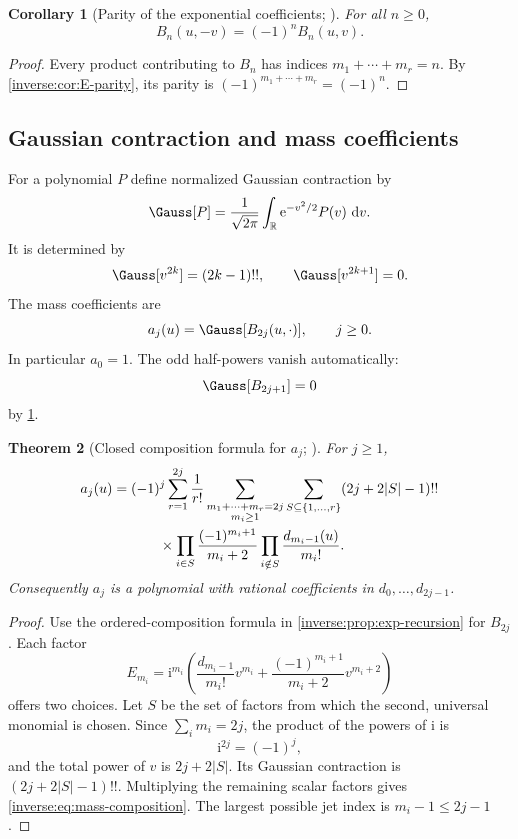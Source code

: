 \documentclass[11pt,oneside]{article}
\newtheorem{theorem}{Theorem}[section]
\newtheorem{corollary}[theorem]{Corollary}
\theoremstyle{definition}
\theoremstyle{remark}
\newcommand{\R}{\mathbb R}
\newcommand{\e}{\mathrm e}
\newcommand{\ii}{\mathrm i}
\newcommand{\dd}{\,\mathrm d}
\begin{document}
\begin{corollary}[Parity of the exponential coefficients; \Formalized]
\label{inverse:cor:B-parity}
For all $n\geq0$,
\[
 B_n(u,-v)=(-1)^nB_n(u,v).
\]
\end{corollary}

\begin{proof}
Every product contributing to $B_n$ has indices
$m_1+\cdots+m_r=n$.  By \cref{inverse:cor:E-parity}, its parity is
$(-1)^{m_1+\cdots+m_r}=(-1)^n$.
\end{proof}

\subsection{Gaussian contraction and mass coefficients}

For a polynomial $P$ define normalized Gaussian contraction by
\[
 \Gauss[P]
 =\frac1{\sqrt{2\pi}}\int_{\R}\e^{-v^2/2}P(v)\,\dd v.
\]
It is determined by
\begin{equation}
 \Gauss[v^{2k}]=(2k-1)!!,\qquad
 \Gauss[v^{2k+1}]=0. \label{inverse:eq:gaussian-moments}
\end{equation}
The mass coefficients are
\begin{equation}
 a_j(u)=\Gauss[B_{2j}(u,\cdot)],\qquad j\geq0.
 \label{inverse:eq:mass-coeff-definition}
\end{equation}
In particular $a_0=1$.  The odd half-powers vanish automatically:
\[
 \Gauss[B_{2j+1}]=0
\]
by \cref{inverse:cor:B-parity}.

\begin{theorem}[Closed composition formula for \(a_j\); \Derived]
\label{inverse:thm:mass-composition}
For $j\geq1$,
\begin{align}
 a_j(u)
 ={}&(-1)^j
 \sum_{r=1}^{2j}\frac1{r!}
 \sum_{\substack{m_1+\cdots+m_r=2j\\m_i\geq1}}
 \sum_{S\subseteq\{1,\dots,r\}}
 (2j+2|S|-1)!! \notag\\
 &\qquad{}\times
 \prod_{i\in S}\frac{(-1)^{m_i+1}}{m_i+2}
 \prod_{i\notin S}\frac{d_{m_i-1}(u)}{m_i!}.
 \label{inverse:eq:mass-composition}
\end{align}
Consequently $a_j$ is a polynomial with rational coefficients in
$d_0,\dots,d_{2j-1}$.
\end{theorem}

\begin{proof}
Use the ordered-composition formula in
\cref{inverse:prop:exp-recursion} for $B_{2j}$.  Each factor
\[
 E_{m_i}
 =\ii^{m_i}\left(
   \frac{d_{m_i-1}}{m_i!}v^{m_i}
   +\frac{(-1)^{m_i+1}}{m_i+2}v^{m_i+2}
 \right)
\]
offers two choices.  Let $S$ be the set of factors from which the second,
universal monomial is chosen.  Since $\sum_i m_i=2j$, the product of the
powers of $\ii$ is
\[
 \ii^{2j}=(-1)^j,
\]
and the total power of $v$ is $2j+2|S|$.  Its Gaussian contraction is
$(2j+2|S|-1)!!$.  Multiplying the remaining scalar factors gives
\eqref{inverse:eq:mass-composition}.  The largest possible jet index is
$m_i-1\leq2j-1$.
\end{proof}
\end{document}
